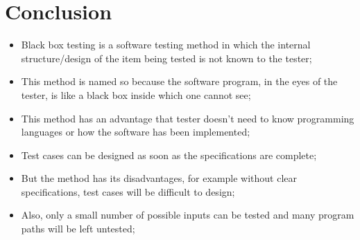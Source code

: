 \section{Conclusion}

\begin{itemize}
	\item Black box testing is a software testing method in which the internal structure/design of the item being tested is not known to the tester;
	\item This method is named so because the software program, in the eyes of the tester, is like a black box inside which one cannot see;
	\item This method has an advantage that tester doesn't need to know programming languages or how the software has been implemented;
	\item Test cases can be designed as soon as the specifications are complete;
	\item But the method has its disadvantages, for example without clear specifications, test cases will be difficult to design;
	\item Also, only a small number of possible inputs can be tested and many program paths will be left untested; 
\end{itemize}

\clearpage